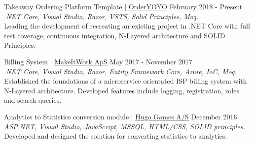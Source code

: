 \documentclass[margin, 10pt, hidelinks]{res} %
\newcommand{\tab}{\hspace*{1em}} %
\begin{document}
\begin{resume}
Takeaway Ordering Platform Template | \href{https://orderyoyo.com/}{\underline{OrderYOYO}} \hfill February 2018  - Present\\
{\it .NET Core, Visual Studio, Razor, VSTS, Solid Principles, Moq.} \\
\tab Leading the development of recreating an existing project in .NET Core with full test coverage, continuous integration, N-Layered architecture and SOLID Principles.

Billing System | \href{http://www.makeitwork.dk}{\underline{MakeItWork ApS}} \hfill May 2017  - November 2017\\
{\it .NET Core, Visual Studio, Razor, Entity Framework Core, Azure, IoC, Moq.} \\
\tab Established the foundations of a microservice orientated ISP billing system with N-Layered architecture. Developed features include logging, registration, roles and search queries.


Analytics to Statistics conversion module | \href{https://hugogames.com/}{\underline{Hugo Games A/S}} \hfill December 2016  \\
{\it ASP.NET, Visual Studio, JavaScript,  MSSQL, HTML/CSS, SOLID principles.}  \\
 \tab Developed and designed the solution for converting statistics to analytics.




\end{resume}
\end{document}
